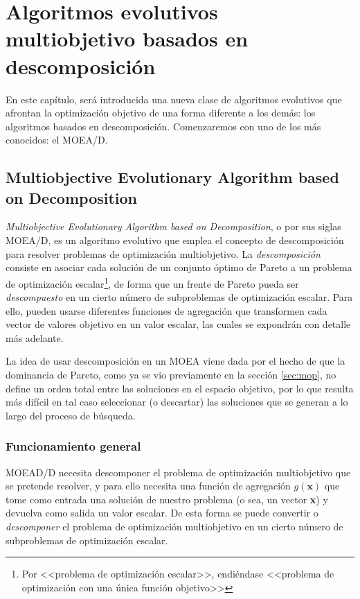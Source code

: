 \chapter{Algoritmos evolutivos multiobjetivo basados en descomposición}

En este capítulo, será introducida una nueva clase de algoritmos evolutivos que afrontan la optimización objetivo de una forma diferente a los demás: los algoritmos basados en descomposición. Comenzaremos con uno de los más conocidos: el MOEA/D.

\section{Multiobjective Evolutionary Algorithm based on Decomposition}

\emph{Multiobjective Evolutionary Algorithm based on Decomposition}, o por sus siglas MOEA/D, \cite{zhang2007moea} es un algoritmo evolutivo que emplea el concepto de descomposición para resolver problemas de optimización multiobjetivo. La \emph{descomposición} consiste en asociar cada solución de un conjunto óptimo de Pareto a un problema de optimización escalar\footnote{Por <<problema de optimización escalar>>, endiéndase <<problema de optimización con una única función objetivo>>}, de forma que un frente de Pareto pueda ser \emph{descompuesto} en un cierto número de subproblemas de optimización escalar. Para ello, pueden usarse diferentes funciones de agregación que transformen cada vector de valores objetivo en un valor escalar, las cuales se expondrán con detalle más adelante.

La idea de usar descomposición en un MOEA viene dada por el hecho de que la dominancia de Pareto, como ya se vio previamente en la sección \ref{sec:mop}, no define un orden total entre las soluciones en el espacio objetivo, por lo que resulta más difícil en tal caso seleccionar (o descartar) las soluciones que se generan a lo largo del proceso de búsqueda.

\subsection{Funcionamiento general}

MOEAD/D necesita descomponer el problema de optimización multiobjetivo que se pretende resolver, y para ello necesita una función de agregación $g(\textbf{x})$ que tome como entrada una solución de nuestro problema (o sea, un vector \textbf{x}) y devuelva como salida un valor escalar. De esta forma se puede convertir o \emph{descomponer} el problema de optimización multiobjetivo en un cierto número de subproblemas de optimización escalar.

